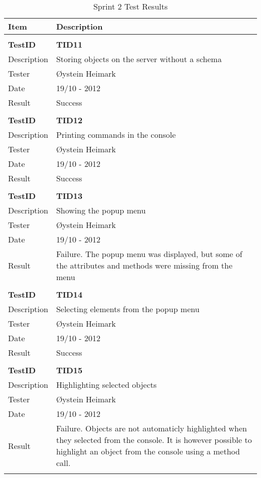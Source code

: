 \begin{table}
\caption{Sprint 2 Test Results}
\centering
\begin{tabular}{ l p{13cm} }

\hline 
Item			&Description		\\
\hline \\ [-2.0ex]

\bf{TestID}		&\bf{TID11}			\\
Description	&Storing objects on the server without a schema	\\
Tester		&Øystein Heimark	\\
Date			&19/10 - 2012	\\
Result		&Success				\\
\hline \\ [-2.0ex]

\bf{TestID}		&\bf{TID12}			\\
Description	&Printing commands in the console 	\\
Tester		&Øystein Heimark	\\
Date			&19/10 - 2012	\\
Result		&Success			\\
\hline \\ [-2.0ex]

\bf{TestID}		&\bf{TID13}			\\
Description	&Showing the popup menu	\\
Tester		&Øystein Heimark	\\
Date			&19/10 - 2012	\\
Result		&Failure. The popup menu was displayed, but some of the attributes and methods were missing from the menu				\\
\hline \\ [-2.0ex]

\bf{TestID}		&\bf{TID14}			\\
Description	&Selecting elements from the popup menu	\\
Tester		&Øystein Heimark	\\
Date			&19/10 - 2012	\\
Result		&Success			\\
\hline \\ [-2.0ex]

\bf{TestID}		&\bf{TID15}			\\
Description	&Highlighting selected objects	\\
Tester		&Øystein Heimark	\\
Date			&19/10 - 2012	\\
Result		&Failure. Objects are not automaticly highlighted when they selected from the console. It is however possible to highlight an object from the console using a method call.	\\
\hline \\ [-2.0ex]


\end{tabular}
\end{table}
